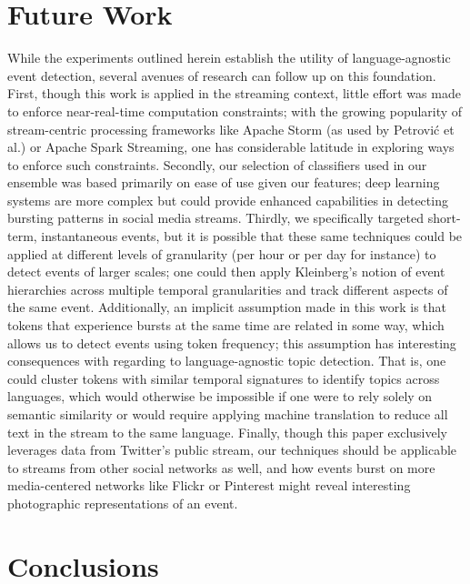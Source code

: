 \documentclass{sig-alternate}
\begin{document}
\section{Future Work}
\label{sect:future}

While the experiments outlined herein establish the utility of language-agnostic event detection, several avenues of research can follow up on this foundation.
First, though this work is applied in the streaming context, little effort was made to enforce near-real-time computation constraints; with the growing popularity of stream-centric processing frameworks like Apache Storm (as used by Petrovi\'{c} et al.) or Apache Spark Streaming, one has considerable latitude in exploring ways to enforce such constraints.
Secondly, our selection of classifiers used in our ensemble was based primarily on ease of use given our features; deep learning systems are more complex but could provide enhanced capabilities in detecting bursting patterns in social media streams.
Thirdly, we specifically targeted short-term, instantaneous events, but it is possible that these same techniques could be applied at different levels of granularity (per hour or per day for instance) to detect events of larger scales; one could then apply Kleinberg's notion of event hierarchies across multiple temporal granularities and track different aspects of the same event.
Additionally, an implicit assumption made in this work is that tokens that experience bursts at the same time are related in some way, which allows us to detect events using token frequency; this assumption has interesting consequences with regarding to language-agnostic topic detection.
That is, one could cluster tokens with similar temporal signatures to identify topics across languages, which would otherwise be impossible if one were to rely solely on semantic similarity or would require applying machine translation to reduce all text in the stream to the same language.
Finally, though this paper exclusively leverages data from Twitter's public stream, our techniques should be applicable to streams from other social networks as well, and how events burst on more media-centered networks like Flickr or Pinterest might reveal interesting photographic representations of an event.

\section{Conclusions}
\label{sect:conlusions}
\end{document}
